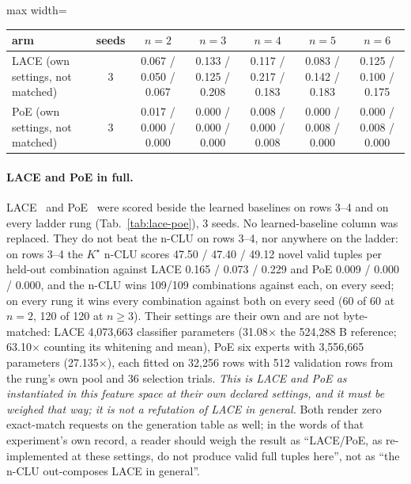 \documentclass{article} %
\newcommand{\Kstar}{\ensuremath{K^{\star}}}
\begin{document}
\begin{table}[h]
\medskip
\begin{adjustbox}{max width=\linewidth}\begin{tabular}{lcccccc}
\toprule
arm & seeds & $n=2$ & $n=3$ & $n=4$ & $n=5$ & $n=6$ \\
\midrule
LACE (own settings, not matched) & 3 & 0.067 / 0.050 / 0.067 & 0.133 / 0.125 / 0.208 & 0.117 / 0.217 / 0.183 & 0.083 / 0.142 / 0.183 & 0.125 / 0.100 / 0.175 \\
PoE (own settings, not matched) & 3 & 0.017 / 0.000 / 0.000 & 0.000 / 0.000 / 0.000 & 0.008 / 0.000 / 0.008 & 0.000 / 0.008 / 0.000 & 0.000 / 0.008 / 0.000 \\
\bottomrule
\end{tabular}\end{adjustbox}
\end{table}

\paragraph{LACE and PoE in full.}
LACE~\citep{nie_controllable_2021} and PoE~\citep{hinton_training_2002} were scored beside the
learned baselines on rows 3--4 and on every ladder rung (Tab.~\ref{tab:lace-poe}), 3 seeds. No
learned-baseline column was replaced. They do not beat the
n-CLU on rows 3--4, nor anywhere on the ladder: on rows 3--4 the $\Kstar$ n-CLU scores 47.50 / %
47.40 / 49.12 novel valid tuples per held-out combination against LACE 0.165 / 0.073 / 0.229 and PoE 0.009 / %
0.000 / 0.000, and the n-CLU wins 109/109 combinations against each, on every seed; on every rung it %
wins every combination against both on every seed (60 of 60 at $n=2$, 120 of 120 at $n\ge3$). %
Their settings are their own and are not byte-matched: LACE 4,073,663 classifier parameters %
(31.08$\times$ the 524,288 B reference; 63.10$\times$ counting its whitening and mean), PoE six %
experts with 3,556,665 parameters (27.135$\times$), each fitted on 32,256 rows with 512 validation %
rows from the rung's own pool and 36 selection trials. %
\emph{This is LACE and PoE as instantiated in this feature space at their own declared settings,
and it must be weighed that way; it is not a refutation of LACE in general.} Both render zero
exact-match requests on the generation table as well; in the words of that experiment's own record, a
reader should weigh the result as ``LACE/PoE, as re-implemented at these settings, do not produce
valid full tuples here'', not as ``the n-CLU out-composes LACE in general''. %
\end{document}
